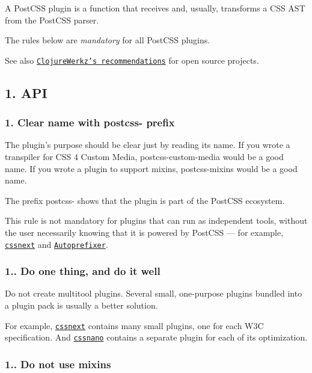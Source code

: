 A Post\+C\+SS plugin is a function that receives and, usually, transforms a C\+SS A\+ST from the Post\+C\+SS parser.

The rules below are {\itshape mandatory} for all Post\+C\+SS plugins.

See also \href{http://blog.clojurewerkz.org/blog/2013/04/20/how-to-make-your-open-source-project-really-awesome/}{\tt Clojure\+Werkz’s recommendations} for open source projects.

\subsection*{1. A\+PI}

\subsubsection*{1. Clear name with {\ttfamily postcss-\/} prefix}

The plugin’s purpose should be clear just by reading its name. If you wrote a transpiler for C\+SS 4 Custom Media, {\ttfamily postcss-\/custom-\/media} would be a good name. If you wrote a plugin to support mixins, {\ttfamily postcss-\/mixins} would be a good name.

The prefix {\ttfamily postcss-\/} shows that the plugin is part of the Post\+C\+SS ecosystem.

This rule is not mandatory for plugins that can run as independent tools, without the user necessarily knowing that it is powered by Post\+C\+SS — for example, \href{http://cssnext.io/}{\tt cssnext} and \href{https://github.com/postcss/autoprefixer}{\tt Autoprefixer}.

\subsubsection*{1.. Do one thing, and do it well}

Do not create multitool plugins. Several small, one-\/purpose plugins bundled into a plugin pack is usually a better solution.

For example, \href{http://cssnext.io/}{\tt cssnext} contains many small plugins, one for each W3C specification. And \href{https://github.com/ben-eb/cssnano}{\tt cssnano} contains a separate plugin for each of its optimization.

\subsubsection*{1.. Do not use mixins}

